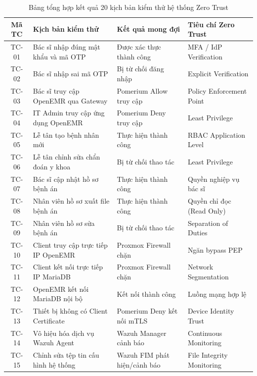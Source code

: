 \begingroup
\setlength\LTleft{0pt}
\setlength\LTright{0pt}
\begin{longtable}{| c | >{\raggedright\arraybackslash}p{4.6cm} | >{\raggedright\arraybackslash}p{4.4cm} | >{\raggedright\arraybackslash}p{4.1cm} |}
\caption{Bảng tổng hợp kết quả 20 kịch bản kiểm thử hệ thống Zero Trust} \label{tab:testcases_summary} \\
\hline
\textbf{Mã TC} & \textbf{Kịch bản kiểm thử} & \textbf{Kết quả mong đợi} & \textbf{Tiêu chí Zero Trust} \\ \hline
\endhead
\hline
\endfoot

TC-01 & Bác sĩ nhập đúng mật khẩu và mã OTP & Được xác thực thành công & MFA / IdP Verification \\ \hline
TC-02 & Bác sĩ nhập sai mã OTP & Bị từ chối đăng nhập & Explicit Verification \\ \hline
TC-03 & Bác sĩ truy cập OpenEMR qua Gateway & Pomerium Allow truy cập & Policy Enforcement Point \\ \hline
TC-04 & IT Admin truy cập ứng dụng OpenEMR & Pomerium Deny truy cập & Least Privilege \\ \hline
TC-05 & Lễ tân tạo bệnh nhân mới & Thực hiện thành công & RBAC Application Level \\ \hline
TC-06 & Lễ tân chỉnh sửa chẩn đoán y khoa & Bị từ chối thao tác & Least Privilege \\ \hline
TC-07 & Bác sĩ cập nhật hồ sơ bệnh án & Thực hiện thành công & Quyền nghiệp vụ bác sĩ \\ \hline
TC-08 & Nhân viên hồ sơ xuất file bệnh án & Thực hiện thành công & Quyền chỉ đọc (Read Only) \\ \hline
TC-09 & Nhân viên hồ sơ sửa bệnh án & Bị từ chối thao tác & Separation of Duties \\ \hline
TC-10 & Client truy cập trực tiếp IP OpenEMR & Proxmox Firewall chặn & Ngăn bypass PEP \\ \hline
TC-11 & Client kết nối trực tiếp IP MariaDB & Proxmox Firewall chặn & Network Segmentation \\ \hline
TC-12 & OpenEMR kết nối MariaDB nội bộ & Kết nối thành công & Luồng mạng hợp lệ \\ \hline
TC-13 & Thiết bị không có Client Certificate & Pomerium Deny kết nối mTLS & Device Identity Trust \\ \hline
TC-14 & Vô hiệu hóa dịch vụ Wazuh Agent & Wazuh Manager cảnh báo & Continuous Monitoring \\ \hline
TC-15 & Chỉnh sửa tệp tin cấu hình hệ thống & Wazuh FIM phát hiện/cảnh báo & File Integrity Monitoring \\ \hline

\end{longtable}
